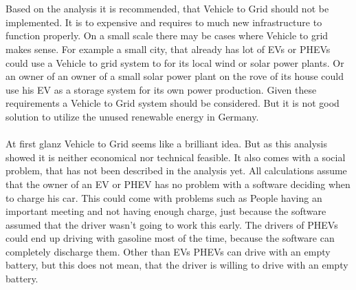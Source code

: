\documentclass[12pt,a4paper]{article}
\begin{document}
\begin{parcolumns}[colwidths={1=2.5 cm, 2=10 cm, 3=2.5cm}]{3}
{\\ \\
\noindent
Based on the analysis it is recommended, that Vehicle to Grid should not be implemented. It is to expensive and requires to much new infrastructure to function properly. On a small scale there may be cases where Vehicle to grid makes sense. For example a small city, that already has lot of EVs or PHEVs could use a Vehicle to grid system to for its local wind or solar power plants. Or an owner of an owner of a small solar power plant on the rove of its house could use his EV as a storage system for its own power production. Given these requirements a Vehicle to Grid system should be considered. But it is not good solution to utilize the unused renewable energy in Germany.
\\ \\
\noindent
At first glanz Vehicle to Grid seems like a brilliant idea. But as this analysis showed it is neither economical nor technical feasible. It also comes with a social problem, that has not been described in the analysis yet. All calculations assume that the owner of an EV or PHEV has no problem with a software deciding when to charge his car. This could come with problems such as People having an important meeting and not having enough charge, just because the software assumed that the driver wasn't going to work this early. The drivers of PHEVs could end up driving with gasoline most of the time, because the software can completely discharge them. Other than EVs PHEVs can drive with an empty battery, but this does not mean, that the driver is willing to drive with an empty battery.
}


\end{parcolumns}
\end{document}

